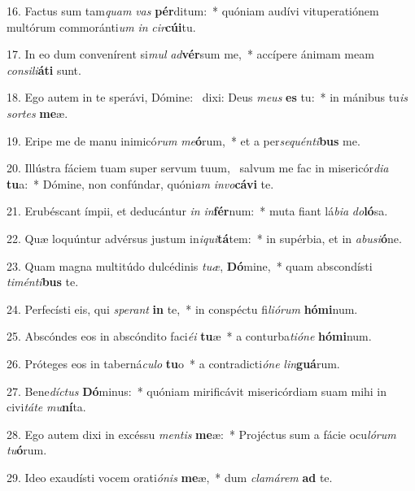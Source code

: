 16. Factus sum tam\textit{quam} \textit{vas} \textbf{pér}ditum:~*  quóniam audívi vituperatiónem multórum commoránti\textit{um} \textit{in} \textit{cir}\textbf{cú}\textbf{i}tu.\

17. In eo dum convenírent si\textit{mul} \textit{ad}\textbf{vér}sum me,~*  accípere ánimam meam \textit{con}\textit{si}\textit{li}\textbf{á}\textbf{ti} sunt.\

18. Ego autem in te sperávi, Dómine: \dag\  dixi: Deus \textit{me}\textit{us} \textbf{es} tu:~*  in mánibus tu\textit{is} \textit{sor}\textit{tes} \textbf{me}æ.\

19. Eripe me de manu inimicó\textit{rum} \textit{me}\textbf{ó}rum,~*  et a per\textit{se}\textit{quén}\textit{ti}\textbf{bus} me.\

20. Illústra fáciem tuam super servum tuum, \dag\  salvum me fac in misericór\textit{di}\textit{a} \textbf{tu}a:~*  Dómine, non confúndar, quóni\textit{am} \textit{in}\textit{vo}\textbf{cá}\textbf{vi} te.\

21. Erubéscant ímpii, et deducántur \textit{in} \textit{in}\textbf{fér}num:~*  muta fiant lá\textit{bi}\textit{a} \textit{do}\textbf{ló}sa.\

22. Quæ loquúntur advérsus justum in\textit{i}\textit{qui}\textbf{tá}tem:~*  in supérbia, et in \textit{ab}\textit{u}\textit{si}\textbf{ó}ne.\

23. Quam magna multitúdo dulcédinis \textit{tu}\textit{æ}, \textbf{Dó}mine,~*  quam abscondísti \textit{ti}\textit{mén}\textit{ti}\textbf{bus} te.\

24. Perfecísti eis, qui \textit{spe}\textit{rant} \textbf{in} te,~*  in conspéctu fi\textit{li}\textit{ó}\textit{rum} \textbf{hó}\textbf{mi}num.\

25. Abscóndes eos in abscóndito faci\textit{é}\textit{i} \textbf{tu}æ~*  a conturba\textit{ti}\textit{ó}\textit{ne} \textbf{hó}\textbf{mi}num.\

26. Próteges eos in taberná\textit{cu}\textit{lo} \textbf{tu}o~*  a contradicti\textit{ó}\textit{ne} \textit{lin}\textbf{guá}rum.\

27. Bene\textit{díc}\textit{tus} \textbf{Dó}minus:~*  quóniam mirificávit misericórdiam suam mihi in civi\textit{tá}\textit{te} \textit{mu}\textbf{ní}ta.\

28. Ego autem dixi in excéssu \textit{men}\textit{tis} \textbf{me}æ:~*  Projéctus sum a fácie ocu\textit{ló}\textit{rum} \textit{tu}\textbf{ó}rum.\

29. Ideo exaudísti vocem orati\textit{ó}\textit{nis} \textbf{me}æ,~*  dum \textit{cla}\textit{má}\textit{rem} \textbf{ad} te.\

